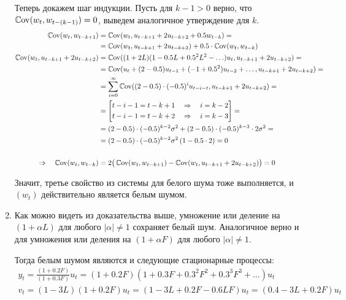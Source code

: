 \begin{problem}
\begin{sol}
\begin{enumerate}
Теперь докажем шаг индукции. Пусть для $k-1 > 0$ верно, что $\operatorname{\mathbb{C}\mathrm{ov}}(w_t, w_{t-(k-1)}) = 0$, выведем аналогичное утверждение для $k$.
\begin{align*}
    \operatorname{\mathbb{C}\mathrm{ov}}(w_t, w_{t-k+1}) &= \operatorname{\mathbb{C}\mathrm{ov}}(w_t, u_{t-k+1} + 2u_{t-k+2} + 0.5w_{t-k}) = \\
    &= \operatorname{\mathbb{C}\mathrm{ov}}(w_t, u_{t-k+1} + 2u_{t-k+2}) + 0.5 \cdot \operatorname{\mathbb{C}\mathrm{ov}}(w_t, w_{t-k}) \\ 
    \operatorname{\mathbb{C}\mathrm{ov}}(w_t, u_{t-k+1} + 2u_{t-k+2}) &= \operatorname{\mathbb{C}\mathrm{ov}}((1 + 2L) (1 - 0.5L + 0.5^2 L^2 - \ldots)u_t, u_{t-k+1} + 2u_{t-k+2}) = \\
    &= \operatorname{\mathbb{C}\mathrm{ov}}(u_t + (2 - 0.5)u_{t-1} + (-1 +0.5^2)u_{t-2} + \ldots, u_{t-k+1} + 2u_{t-k+2}) = \\
    &= \sum_{i=0}^{\infty} \operatorname{\mathbb{C}\mathrm{ov}}((2 - 0.5) \cdot (-0.5)^i u_{t-i-t}, u_{t-k+1} + 2u_{t-k+2}) = \\
    &= \left[\begin{aligned}
        t - i - 1 = t - k + 1 \quad \Rightarrow \quad i = k - 2 \\
        t - i - 1 = t - k + 2 \quad \Rightarrow \quad i = k - 3 \\
    \end{aligned}\right] = \\
    &= (2 - 0.5) \cdot (-0.5)^{k-2} \sigma^2 + (2 - 0.5) \cdot (-0.5)^{k-3}\cdot 2 \sigma^2 = \\
    &= (2 - 0.5) \cdot (-0.5)^{k-2} \sigma^2 \left(1 - 0.5 \cdot 2\right) = 0 \\ \\
    \Rightarrow \quad \operatorname{\mathbb{C}\mathrm{ov}}(w_t, w_{t-k}) &= 2\big(\operatorname{\mathbb{C}\mathrm{ov}}(w_t, w_{t-k+1}) - \operatorname{\mathbb{C}\mathrm{ov}}(w_t, u_{t-k+1} + 2u_{t-k+2})\big) = 0
\end{align*}

Значит, третье свойство из системы для белого шума тоже выполняется, и $(w_t)$ действительно является белым шумом. 

\item 
Как можно видеть из доказательства выше, умножение или деление на $(1 + \alpha L)$ для любого $|\alpha| \neq 1$ сохраняет белый шум. 
Аналогичное верно и для умножения или деления на $(1 + \alpha F)$ для любого $|\alpha| \neq 1$.

Тогда белым шумом являются и следующие стационарные процессы:
\begin{gather*}
    y_t = \frac{(1 + 0.2F)}{(1 + 0.3F)} u_t = (1 + 0.2F)(1 + 0.3F + 0.3^2F^2 + 0.3^3 F^3 + \ldots) u_t\\
    v_t = (1 - 3L)(1 + 0.2 F) u_t = (1 - 3L + 0.2F - 0.6LF)u_t = (0.4 - 3L + 0.2F) u_t
\end{gather*}
\end{enumerate}
  \end{sol}
\end{problem}





